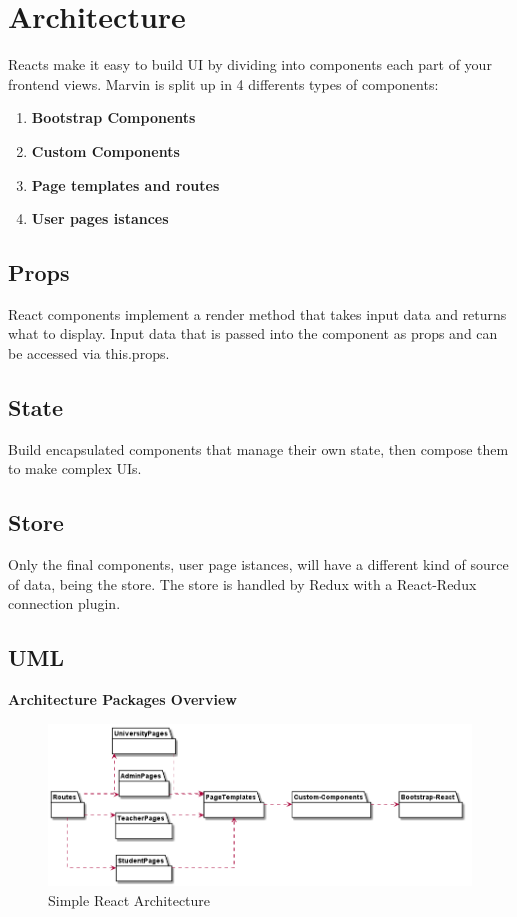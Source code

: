 \section{Architecture}

	Reacts make it easy to build UI by dividing into components each part of your frontend views.
	Marvin is split up in 4 differents types of components:
	\begin{enumerate} 
		\item \textbf{Bootstrap Components}
		\item \textbf{Custom Components}
		\item \textbf{Page templates and routes}
		\item \textbf{User pages istances}
	\end{enumerate} 

	\subsection{Props}
	React components implement a render method that takes input data and returns what to display.
	Input data that is passed into the component as props and can be accessed via this.props.

	\subsection{State}
	Build encapsulated components that manage their own state, then compose them to make complex UIs.

	\subsection{Store}
	Only the final components, user page istances, will have a different kind of source of data, being the store.
	The store is handled by Redux with a React-Redux connection plugin.
	
	\subsection{UML} %
	
	\textbf{Architecture Packages Overview}
	\begin{figure}[H]
		\centering
		\includegraphics[width=1\linewidth]{"diagrammi/react/simplearch"}
		\caption{Simple React Architecture}
		\label{fig:Simple React Architecture}
	\end{figure}
	
